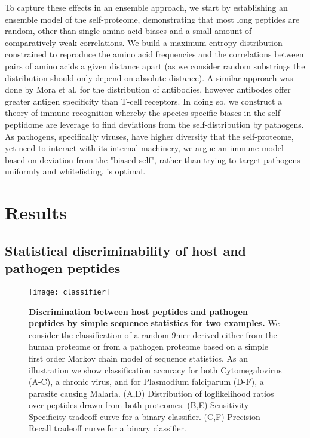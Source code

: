 \documentclass[superscriptaddress,twocolumn,pre]{revtex4}
\newcommand{\<}{\langle}
\renewcommand{\>}{\rangle}
\begin{document}
To capture these effects in an ensemble approach, we start by establishing an ensemble model of the self-proteome, demonstrating that most long peptides are random, other than single amino acid biases and a small amount of comparatively weak correlations. We build a maximum entropy distribution constrained to reproduce the amino acid frequencies and the correlations between pairs of amino acids a given distance apart (as we consider random substrings the distribution should only depend on absolute distance). A similar approach was done by Mora et al. \cite{Mora2010} for the distribution of antibodies, however antibodes offer greater antigen specificity than T-cell receptors. In doing so, we construct a theory of immune recognition whereby the species specific biases in the self-peptidome are leverage to find deviations from the self-distribution by pathogens. As pathogens, specifically viruses, have higher diversity that the self-proteome, yet need to interact with its internal machinery, we argue an immune model based on deviation from the "biased self", rather than trying to target pathogens uniformly and whitelisting, is optimal. 

\section{Results}

\subsection{Statistical discriminability of host and pathogen peptides}


\begin{figure*}
    \texttt{[image: classifier]}
    \caption{{\bf Discrimination between host peptides and pathogen peptides by simple sequence statistics for two examples.} We consider the classification of a random 9mer derived either from the human proteome or from a pathogen proteome based on a simple first order Markov chain model of sequence statistics. As an illustration we show classification accuracy for both Cytomegalovirus (A-C), a chronic virus, and for Plasmodium falciparum (D-F), a parasite causing Malaria. (A,D) Distribution of loglikelihood ratios over peptides drawn from both proteomes. (B,E) Sensitivity-Specificity tradeoff curve for a binary classifier. (C,F) Precision-Recall tradeoff curve for a binary classifier.
    \label{figclassifier}
    }
\end{figure*}
\end{document}

